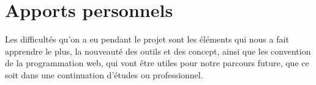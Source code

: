 \documentclass[a4paper,12pt]{report}
\theoremstyle{break}
\theoremstyle{break}
\theoremstyle{break}
\theoremstyle{break}
\theoremstyle{definition}
\theoremstyle{remark}
\begin{document}
\section{Apports personnels}
Les difficultés qu'on a eu pendant le projet sont les éléments qui nous a fait apprendre le plus,
la nouveauté des outils et des concept, ainsi que les convention de la programmation web, qui vont être utiles pour
notre parcours future, que ce soit dans une continuation d'études ou professionnel.

\begin{appendices}
\end{appendices}


\end{document}
